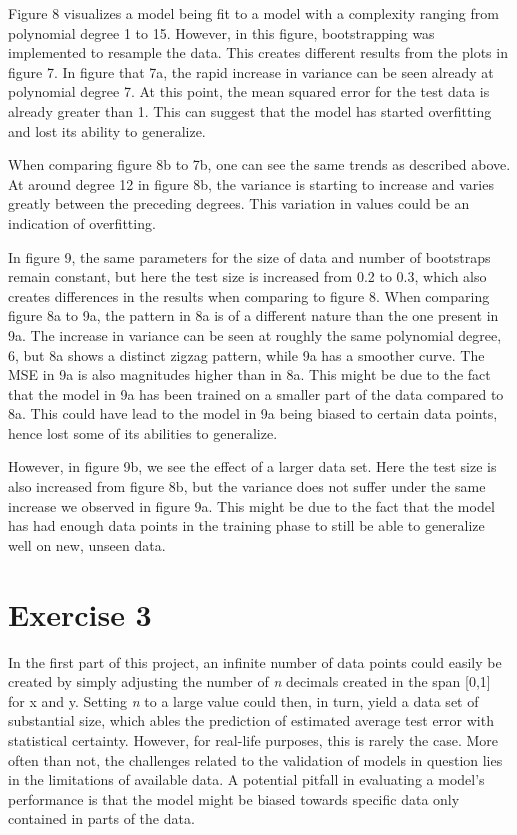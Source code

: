 \documentclass[11pt, a4paper]{article}
\begin{document}
Figure 8 visualizes a model being fit to a model with a complexity ranging from polynomial degree 1 to 15. However, in this figure, bootstrapping was implemented to resample the data. This creates different results from the plots in figure 7. In figure that 7a, the rapid increase in variance can be seen already at polynomial degree 7. At this point, the mean squared error for the test data is already greater than 1.  This can suggest that the model has started overfitting and lost its ability to generalize. 

When comparing figure 8b to 7b, one can see the same trends as described above. At around degree 12 in figure 8b, the variance is starting to increase and varies greatly between the preceding degrees. This variation in values could be an indication of overfitting. 

In figure 9, the same parameters for the size of data and number of bootstraps remain constant, but here the test size is increased from 0.2 to 0.3, which also creates differences in the results when comparing to figure 8. When comparing figure 8a to 9a, the pattern in 8a is of a different nature than the one present in 9a. The increase in variance can be seen at roughly the same polynomial degree, 6, but 8a shows a distinct zigzag pattern, while 9a has a smoother curve. The MSE in 9a is also magnitudes higher than in 8a. This might be due to the fact that the model in 9a has been trained on a smaller part of the data compared to 8a. This could have lead to the model in 9a being biased to certain data points, hence lost some of its abilities to generalize. 

However, in figure 9b, we see the effect of a larger data set. Here the test size is also increased from figure 8b, but the variance does not suffer under the same increase we observed in figure 9a. This might be due to the fact that the model has had enough data points in the training phase to still be able to generalize well on new, unseen data. 


\section*{\label{ex:3}Exercise 3}
In the first part of this project, an infinite number of data points could easily be created by simply adjusting the number of \emph{n} decimals created in the span [0,1] for x and y. Setting \emph{n} to a large value could then, in turn, yield a data set of substantial size, which ables the prediction of estimated average test error with statistical certainty. However, for real-life purposes, this is rarely the case. More often than not, the challenges related to the validation of models in question lies in the limitations of available data. A potential pitfall in evaluating a model's performance is that the model might be biased towards specific data only contained in parts of the data. 
\end{document}
